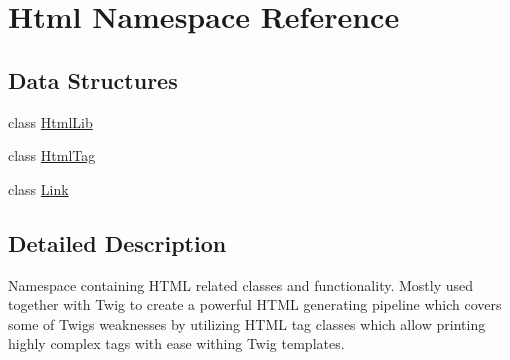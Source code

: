 \hypertarget{namespace_html}{}\section{Html Namespace Reference}
\label{namespace_html}
\subsection*{Data Structures}
\begin{DoxyCompactItemize}
\item 
class \hyperlink{class_html_1_1_html_lib}{Html\+Lib}
\item 
class \hyperlink{class_html_1_1_html_tag}{Html\+Tag}
\item 
class \hyperlink{class_html_1_1_link}{Link}
\end{DoxyCompactItemize}


\subsection{Detailed Description}
Namespace containing H\+T\+ML related classes and functionality. Mostly used together with Twig to create a powerful H\+T\+ML generating pipeline which covers some of Twigs weaknesses by utilizing H\+T\+ML tag classes which allow printing highly complex tags with ease withing Twig templates. 